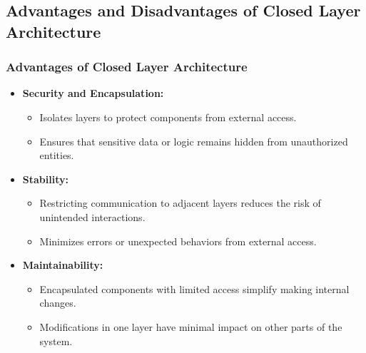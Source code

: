 \documentclass[aspectratio=169, table]{beamer}
\begin{document}
\subsection{Advantages and Disadvantages of Closed Layer Architecture}

\begin{frame}
	\frametitle{Advantages of Closed Layer Architecture}
	\begin{itemize}
		\item \textbf{Security and Encapsulation:}
		\begin{itemize}
			\item Isolates layers to protect components from external access.
			\item Ensures that sensitive data or logic remains hidden from unauthorized entities.
		\end{itemize}
		\item \textbf{Stability:}
		\begin{itemize}
			\item Restricting communication to adjacent layers reduces the risk of unintended interactions.
			\item Minimizes errors or unexpected behaviors from external access.
		\end{itemize}
		\item \textbf{Maintainability:}
		\begin{itemize}
			\item Encapsulated components with limited access simplify making internal changes.
			\item Modifications in one layer have minimal impact on other parts of the system.
		\end{itemize}
	\end{itemize}
\end{frame}
\end{document}
